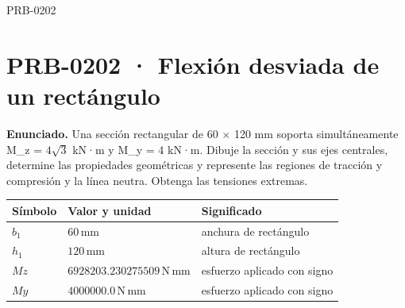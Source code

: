 \begin{studiumworked}{PRB-0202}

\section{PRB-0202 · Flexión desviada de un rectángulo}

\textbf{Enunciado.} Una sección rectangular de 60 \ensuremath{\times} 120 mm soporta simultáneamente M\_z = $4\sqrt{3}$ kN·m y M\_y = 4 kN·m. Dibuje la sección y sus ejes centrales, determine las propiedades geométricas y represente las regiones de tracción y compresión y la línea neutra. Obtenga las tensiones extremas.

\par\medskip\noindent\begin{tabular}{@{}p{.18\linewidth}p{.26\linewidth}p{.48\linewidth}@{}}
\toprule Símbolo & Valor y unidad & Significado\\\midrule
$b_{1}$ & $60\,\mathrm{mm}$ & anchura de rectángulo\\
$h_{1}$ & $120\,\mathrm{mm}$ & altura de rectángulo\\
$Mz$ & $6928203.230275509\,\mathrm{N\,mm}$ & esfuerzo aplicado con signo\\
$My$ & $4000000.0\,\mathrm{N\,mm}$ & esfuerzo aplicado con signo\\
\bottomrule\end{tabular}\par\medskip


\end{studiumworked}
